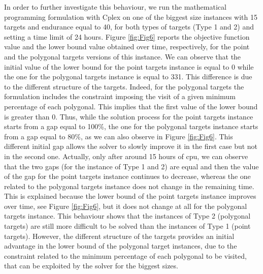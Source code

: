In order to further investigate this behaviour, we run the mathematical programming formulation with Cplex on one of the biggest size instances with 15 targets and endurance equal to 40, for both types of targets (Type 1 and 2) and setting a time limit of 24 hours. Figure \ref{fig:Fig6} reports the objective function value and the lower bound value obtained over time, respectively, for the point and the polygonal targets versions of this instance. We can observe that the initial value of the lower bound for the point targets instance is equal to 0 while the one for the polygonal targets instance is equal to 331. This difference is due to the different structure of the targets. Indeed, for the polygonal targets the formulation includes the constraint imposing the visit of a given minimum percentage of each polygonal. This implies that the first value of the lower bound is greater than 0. Thus, while the solution process for the point targets instance starts from a gap equal to 100\%, the one for the polygonal targets instance starts from a gap equal to 80\%, as we can also observe in Figure \ref{fig:Fig6}. This different initial gap allows the solver to slowly improve it in the first case but not in the second one. Actually, only after around 15 hours of cpu, we can observe that the two gaps (for the instance of Type 1 and 2) are equal and then the value of the gap for the point targets instance continues to decrease, whereas the one related to the polygonal targets instance does not change in the remaining time. This is explained because the lower bound of the point targets instance improves over time, see Figure \ref{fig:Fig6}, but it does not change at all for the polygonal targets instance.
This behaviour shows that the instances of Type 2 (polygonal targets) are still more difficult to be solved than the instances of Type 1 (point targets). However, the different structure of the targets provides an initial advantage in the lower bound of the polygonal target instances, due to the constraint related to the minimum percentage of each polygonal to be visited, that can be exploited by the solver for the biggest sizes.




















